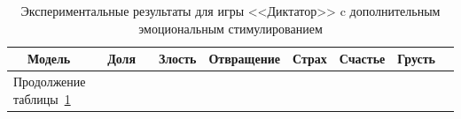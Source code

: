 \begin{small}

\begin{longtable}[c]{|c|c|c|c|c|c|c|c|}
    \caption{Экспериментальные результаты для игры <<Диктатор>> c дополнительным эмоциональным стимулированием}\label{tab:multlag-with-prompt}
    \\
    \hline
Модель & Доля & Злость & Отвращение & Страх  & Счастье & Грусть \\ \hline
    \endfirsthead   
    \multicolumn{2}{l}{\hspace{-2mm}\normalsize{Продолжение таблицы~\ref{tab:multlag-with-prompt}}}        \\ %
\hline


\end{longtable}
\end{small}
